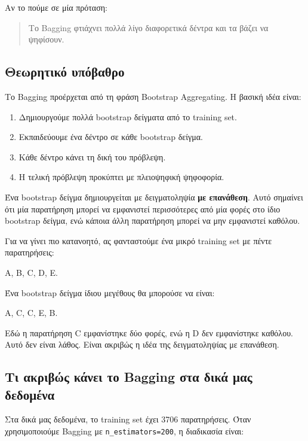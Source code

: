 \documentclass[12pt,a4paper]{article}
\newcommand{\code}[1]{\texttt{\textenglish{#1}}}
\begin{document}
Αν το πούμε σε μία πρόταση:

\begin{quote}
Το Bagging φτιάχνει πολλά λίγο διαφορετικά δέντρα και τα βάζει να ψηφίσουν.
\end{quote}

\subsection{Θεωρητικό υπόβαθρο}

Το Bagging προέρχεται από τη φράση \textenglish{Bootstrap Aggregating}. Η
βασική ιδέα είναι:

\begin{enumerate}
    \item Δημιουργούμε πολλά bootstrap δείγματα από το training set.
    \item Εκπαιδεύουμε ένα δέντρο σε κάθε bootstrap δείγμα.
    \item Κάθε δέντρο κάνει τη δική του πρόβλεψη.
    \item Η τελική πρόβλεψη προκύπτει με πλειοψηφική ψηφοφορία.
\end{enumerate}

Ένα bootstrap δείγμα δημιουργείται με δειγματοληψία \textbf{με επανάθεση}.
Αυτό σημαίνει ότι μία παρατήρηση μπορεί να εμφανιστεί περισσότερες από μία
φορές στο ίδιο bootstrap δείγμα, ενώ κάποια άλλη παρατήρηση μπορεί να μην
εμφανιστεί καθόλου.

Για να γίνει πιο κατανοητό, ας φανταστούμε ένα μικρό training set με πέντε
παρατηρήσεις:

\begin{center}
A, B, C, D, E.
\end{center}

Ένα bootstrap δείγμα ίδιου μεγέθους θα μπορούσε να είναι:

\begin{center}
A, C, C, E, B.
\end{center}

Εδώ η παρατήρηση C εμφανίστηκε δύο φορές, ενώ η D δεν εμφανίστηκε καθόλου.
Αυτό δεν είναι λάθος. Είναι ακριβώς η ιδέα της δειγματοληψίας με επανάθεση.

\subsection{Τι ακριβώς κάνει το Bagging στα δικά μας δεδομένα}

Στα δικά μας δεδομένα, το training set έχει 3706 παρατηρήσεις. Όταν
χρησιμοποιούμε Bagging με \code{n\_estimators=200}, η διαδικασία είναι:
\end{document}
